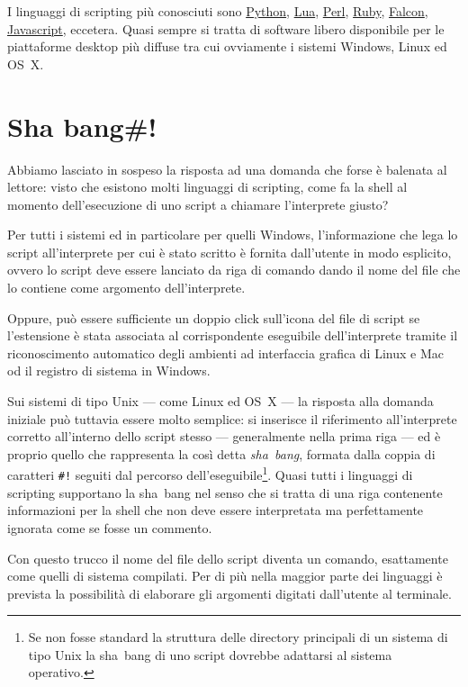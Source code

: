I linguaggi di scripting più conosciuti sono
\href{http://www.python.org/}{Python}, \href{http://www.lua.org/}{Lua},
\href{http://www.perl.org/}{Perl}, \href{http://www.ruby-lang.org/}{Ruby},
\href{http://www.falconpl.org/}{Falcon},
\href{http://it.wikipedia.org/wiki/JavaScript}{Javascript}, eccetera. Quasi
sempre si tratta di software libero disponibile per le piattaforme desktop più
diffuse tra cui ovviamente i sistemi Windows, Linux ed OS~X.

\section{Sha bang\#!}

Abbiamo lasciato in sospeso la risposta ad una domanda che forse è balenata al
lettore: visto che esistono molti linguaggi di scripting, come fa la shell al
momento dell'esecuzione di uno script a chiamare l'interprete giusto?

Per tutti i sistemi ed in particolare per quelli Windows, l'informazione che
lega lo script all'interprete per cui è stato scritto è fornita dall'utente in
modo esplicito, ovvero lo script deve essere lanciato da riga di comando dando
il nome del file che lo contiene come argomento dell'interprete.

Oppure, può essere sufficiente un doppio click sull'icona del file di script
se l'estensione è stata associata al corrispondente eseguibile dell'interprete
tramite il riconoscimento automatico degli ambienti ad interfaccia grafica di
Linux e Mac od il registro di sistema in Windows.

Sui sistemi di tipo Unix --- come Linux ed OS~X --- la risposta alla domanda
iniziale può tuttavia essere molto semplice: si inserisce il riferimento
all'interprete corretto all'interno dello script stesso --- generalmente nella
prima riga --- ed è proprio quello che rappresenta la così detta
\emph{sha~bang}, formata dalla coppia di caratteri \texttt{\#!} seguiti dal
percorso dell'eseguibile\footnote{Se non fosse standard la struttura delle
  directory principali di un sistema di tipo Unix la sha~bang di uno script
  dovrebbe adattarsi al sistema operativo.}. Quasi tutti i linguaggi di
scripting supportano la sha~bang nel senso che si tratta di una riga contenente
informazioni per la shell che non deve essere interpretata ma perfettamente
ignorata come se fosse un commento.

Con questo trucco il nome del file dello script diventa un comando,
esattamente come quelli di sistema compilati. Per di più nella maggior parte
dei linguaggi è prevista la possibilità di elaborare gli argomenti digitati
dall'utente al terminale.

